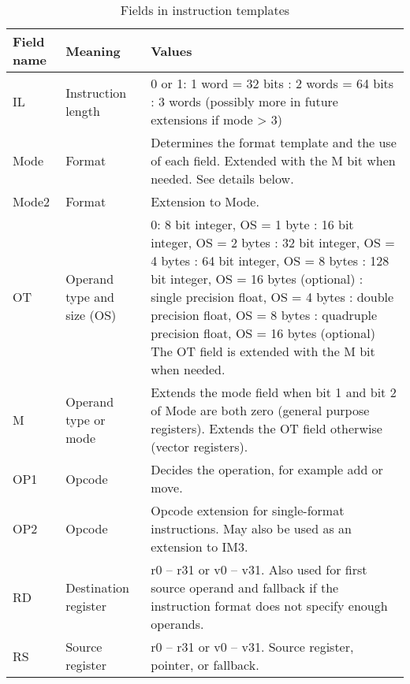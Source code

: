 \documentclass[forwardcom.tex]{subfiles}
\begin{document}
\begin{longtable} {|p{16mm}|p{16mm}|p{85mm}|}
\caption{Fields in instruction templates} \label{table:fieldsInTemplates} \\
\endfirsthead
\endhead
\hline
\bfseries Field name & \bfseries Meaning & \bfseries Values  \\
\hline
IL & Instruction length & 0 or 1: 1 word = 32 bits \newline
2: 2 words = 64 bits \newline
3: 3 words (possibly more in future extensions if mode > 3)  \\
\hline
Mode & Format & Determines the format template and the use of each field. 
Extended with the M bit when needed. \newline 
See details below. \\
\hline
Mode2 & Format & Extension to Mode. \\
\hline
OT & Operand type and size (OS) & 
0: 8 bit integer, OS = 1 byte  \newline
1: 16 bit integer, OS = 2 bytes \newline
2: 32 bit integer, OS = 4 bytes \newline
3: 64 bit integer, OS = 8 bytes \newline
4: 128 bit integer, OS = 16 bytes (optional) \newline
5: single precision float, OS = 4 bytes \newline
6: double precision float, OS = 8 bytes \newline
7: quadruple precision float, OS = 16 bytes (optional) \newline
The OT field is extended with the M bit when needed. \\
\hline
M & Operand type or mode & Extends the mode field when bit 1 and bit 2 of Mode are both zero (general purpose registers). Extends the OT field otherwise (vector registers).  \\
\hline
OP1 & Opcode & Decides the operation, for example add or move.  \\
\hline
OP2 & Opcode & Opcode extension for single-format instructions. \newline
               May also be used as an extension to IM3. \\
\hline
RD & Destination register & r0 – r31 or v0 – v31. Also used for first source operand and fallback if the instruction format does not specify enough operands. \\
\hline
RS & Source register & r0 – r31 or v0 – v31. Source register, pointer, or fallback. \\

\end{longtable}
\end{document}
